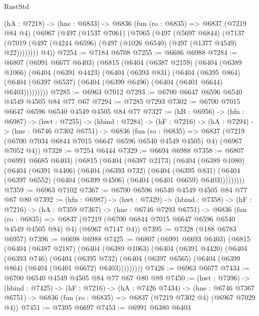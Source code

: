 \begin{lexlean}{RustStd}
\begin{coremodule}
  (hA : @7218) ->
  (hne : @6833) ->
  @6836
    (fun (ro : @6835) =>
    @6837
      (@7219 @84 @4)
      (@6967
        (@497
          (@1537 @7061)
          (@7065
            (@497
              (@5697 @6844)
              (@7137 (@7019 (@497 (@4244 @6596) (@497 (@1026 @6540) (@497 (@1377 @4549) @22))))))))
        @4))
@7254 := @7184 @6708
@7255 := @6686 @6988
@7284 := @6807
    (@6991 @6677 @6403)
    (@6815
      (@6404
        (@6387 @2159)
        (@6404
          (@6389 @1066)
          (@6404
            (@6391 @4423)
            (@6404
              (@6393 @831)
              (@6404
                (@6395 @864)
                (@6404 (@6397 @6537) (@6404 (@6399 @6496) (@6404 (@6401 @6644) @6403)))))))))
@7285 := @6963 @7012
@7293 := @6700 @6647 @6596 @6540 @4549 @4505 @84 @77 @67
@7294 := @7285 @7293
@7302 := @6700 @7015 @6647 @6596 @6540 @4549 @4505 @84 @77
@7327 := (hB : @6956) ->
  (hfn : @6987) ->
  (hwt : @7255) ->
  (hbind : @7284) ->
  (hF : @7216) ->
  (hA : @7294) ->
  (hne : @6746 @7302 @6751) ->
  @6836
    (fun (ro : @6835) =>
    @6837 (@7219 (@6700 @7034 @6844 @7015 @6647 @6596 @6540 @4549 @4505) @4) (@6967 @7052 @4))
@7328 := @7254 @6444
@7329 := @6694 @6988
@7358 := @6807
    (@6991 @6685 @6403)
    (@6815
      (@6404
        (@6387 @2173)
        (@6404
          (@6389 @1080)
          (@6404
            (@6391 @4406)
            (@6404
              (@6393 @732)
              (@6404
                (@6395 @831)
                (@6404 (@6397 @6552) (@6404 (@6399 @4506) (@6404 (@6401 @6659) @6403)))))))))
@7359 := @6963 @7102
@7367 := @6700 @6596 @6540 @4549 @4505 @84 @77 @67 @80
@7392 := (hfn : @6987) ->
  (hwt : @7329) ->
  (hbind : @7358) ->
  (hF : @7216) ->
  (hA : @7359 @7367) ->
  (hne : @6746 @7293 @6751) ->
  @6836
    (fun (ro : @6835) =>
    @6837 (@7219 (@6700 @6844 @7015 @6647 @6596 @6540 @4549 @4505 @84) @4) (@6967 @7147 @4))
@7395 := @7328 (@188 @6783 @6957)
@7396 := @6698 @6988
@7425 := @6807
    (@6991 @6693 @6403)
    (@6815
      (@6404
        (@6387 @2187)
        (@6404
          (@6389 @1063)
          (@6404
            (@6391 @4420)
            (@6404
              (@6393 @746)
              (@6404
                (@6395 @732)
                (@6404 (@6397 @6565) (@6404 (@6399 @864) (@6404 (@6401 @6672) @6403)))))))))
@7426 := @6963 @6677
@7434 := @6700 @6540 @4549 @4505 @84 @77 @67 @80 @89
@7450 := (hwt : @7396) ->
  (hbind : @7425) ->
  (hF : @7216) ->
  (hA : @7426 @7434) ->
  (hne : @6746 @7367 @6751) -> @6836 (fun (ro : @6835) => @6837 (@7219 @7302 @4) (@6967 @7029 @4))
@7451 := @7395 @6697
@7453 := @6991 @6380 @6403

\end{coremodule}
\end{lexlean}
